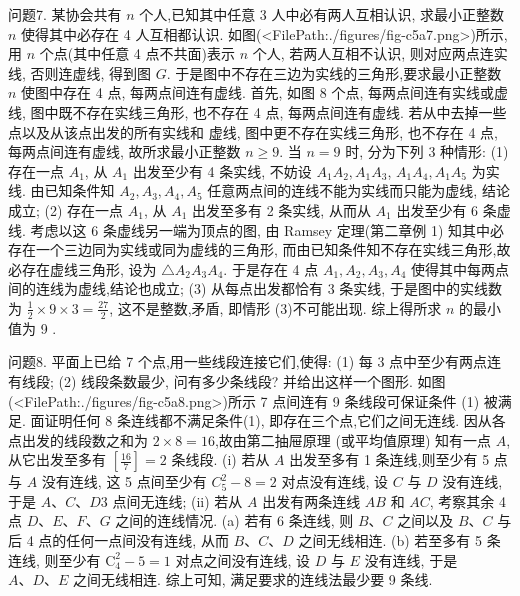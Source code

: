 问题7. 某协会共有 $n$ 个人,已知其中任意 3 人中必有两人互相认识, 求最小正整数 $n$ 使得其中必存在 4 人互相都认识.
如图(<FilePath:./figures/fig-c5a7.png>)所示, 用 $n$ 个点(其中任意 4 点不共面)表示 $n$ 个人, 若两人互相不认识, 则对应两点连实线, 否则连虚线, 得到图 $G$. 于是图中不存在三边为实线的三角形,要求最小正整数 $n$ 使图中存在 4 点, 每两点间连有虚线.
首先, 如图 8 个点, 每两点间连有实线或虚线, 图中既不存在实线三角形, 也不存在 4 点, 每两点间连有虚线.
若从中去掉一些点以及从该点出发的所有实线和 虚线, 图中更不存在实线三角形, 也不存在 4 点, 每两点间连有虚线, 故所求最小正整数 $n \geqslant 9$. 当 $n=9$ 时, 分为下列 3 种情形:
(1) 存在一点 $A_1$, 从 $A_1$ 出发至少有 4 条实线, 不妨设 $A_1 A_2, A_1 A_3$, $A_1 A_4, A_1 A_5$ 为实线.
由已知条件知 $A_2, A_3, A_4, A_5$ 任意两点间的连线不能为实线而只能为虚线, 结论成立; 
(2) 存在一点 $A_1$, 从 $A_1$ 出发至多有 2 条实线, 从而从 $A_1$ 出发至少有 6 条虚线.
考虑以这 6 条虚线另一端为顶点的图, 由 Ramsey 定理(第二章例 1) 知其中必存在一个三边同为实线或同为虚线的三角形, 而由已知条件知不存在实线三角形,故必存在虚线三角形, 设为 $\triangle A_2 A_3 A_4$. 于是存在 4 点 $A_1, A_2, A_3, A_4$ 使得其中每两点间的连线为虚线,结论也成立; (3) 从每点出发都恰有 3 条实线, 于是图中的实线数为 $\frac{1}{2} \times 9 \times 3=\frac{27}{2}$, 这不是整数,矛盾, 即情形 (3)不可能出现.
综上得所求 $n$ 的最小值为 9 .



问题8. 平面上已给 7 个点,用一些线段连接它们,使得: (1) 每 3 点中至少有两点连有线段; (2) 线段条数最少, 问有多少条线段? 并给出这样一个图形.
如图(<FilePath:./figures/fig-c5a8.png>)所示 7 点间连有 9 条线段可保证条件 (1) 被满足.
面证明任何 8 条连线都不满足条件(1), 即存在三个点,它们之间无连线.
因从各点出发的线段数之和为 $2 \times 8=16$,故由第二抽屉原理 (或平均值原理) 知有一点 $A$,从它出发至多有 $\left[\frac{16}{7}\right]=2$ 条线段.
(i) 若从 $A$ 出发至多有 1 条连线,则至少有 5 点与 $A$ 没有连线, 这 5 点间至少有 $C_5^2-8=2$ 对点没有连线, 设 $C$ 与
$D$ 没有连线, 于是 $A 、 C 、 D 3$ 点间无连线; (ii) 若从 $A$ 出发有两条连线 $A B$ 和 $A C$, 考察其余 4 点 $D 、 E 、 F 、 G$ 之间的连线情况.
(a) 若有 6 条连线, 则 $B 、 C$ 之间以及 $B 、 C$ 与后 4 点的任何一点间没有连线, 从而 $B 、 C 、 D$ 之间无线相连.
(b) 若至多有 5 条连线, 则至少有 $\mathrm{C}_4^2-5=1$ 对点之间没有连线, 设 $D$ 与 $E$ 没有连线, 于是 $A 、 D 、 E$ 之间无线相连.
综上可知, 满足要求的连线法最少要 9 条线.



